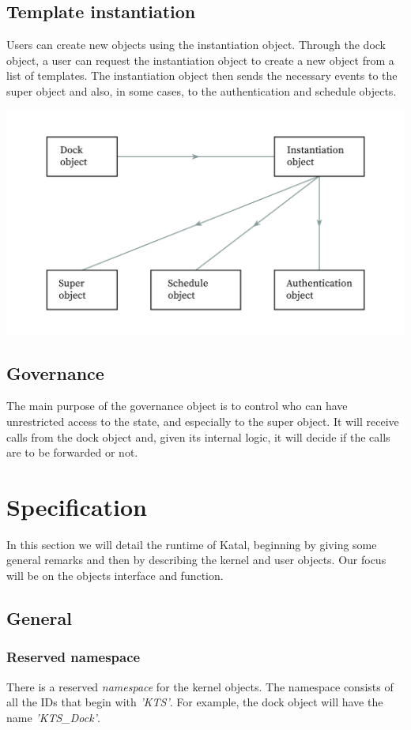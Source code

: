 \documentclass[conference]{IEEEtran}
\begin{document}
\subsection{Template instantiation}
Users can create new objects using the instantiation object. Through the dock object, a user can request the instantiation object to create a new object from a list of templates. The instantiation object then sends the necessary events to the super object and also, in some cases, to the authentication and schedule objects.

\includegraphics[width=\linewidth]{images/instantiating.jpg}

\subsection{Governance}
The main purpose of the governance object is to control who can have unrestricted access to the state, and especially to the super object. It will receive calls from the dock object and, given its internal logic, it will decide if the calls are to be forwarded or not.

\section{Specification}
In this section we will detail the runtime of Katal, beginning by giving some general remarks and then by describing the kernel and user objects. Our focus will be on the objects interface and function.

\subsection{General}

\subsubsection{Reserved namespace}
There is a reserved \textit{namespace} for the kernel objects. The namespace consists of all the IDs that begin with \textit{'KTS'}. For example, the dock object will have the name \textit{'KTS\_Dock'}.
\end{document}

